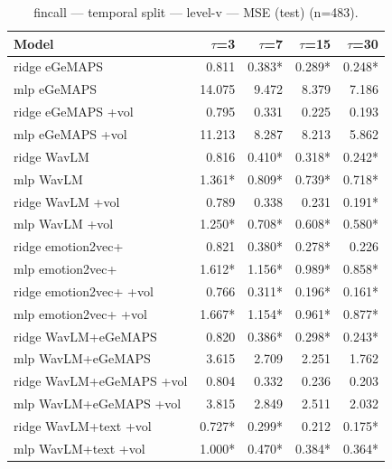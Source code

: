 \begin{table}[t]
\centering
\begin{tabular}{lrrrr}
\toprule
Model & $\tau$=3 & $\tau$=7 & $\tau$=15 & $\tau$=30 \\
\midrule
ridge eGeMAPS & 0.811 & 0.383* & 0.289* & 0.248* \\
mlp eGeMAPS & 14.075 & 9.472 & 8.379 & 7.186 \\
ridge eGeMAPS +vol & 0.795 & 0.331 & 0.225 & 0.193 \\
mlp eGeMAPS +vol & 11.213 & 8.287 & 8.213 & 5.862 \\
ridge WavLM & 0.816 & 0.410* & 0.318* & 0.242* \\
mlp WavLM & 1.361* & 0.809* & 0.739* & 0.718* \\
ridge WavLM +vol & 0.789 & 0.338 & 0.231 & 0.191* \\
mlp WavLM +vol & 1.250* & 0.708* & 0.608* & 0.580* \\
ridge emotion2vec+ & 0.821 & 0.380* & 0.278* & 0.226 \\
mlp emotion2vec+ & 1.612* & 1.156* & 0.989* & 0.858* \\
ridge emotion2vec+ +vol & 0.766 & 0.311* & 0.196* & 0.161* \\
mlp emotion2vec+ +vol & 1.667* & 1.154* & 0.961* & 0.877* \\
ridge WavLM+eGeMAPS & 0.820 & 0.386* & 0.298* & 0.243* \\
mlp WavLM+eGeMAPS & 3.615 & 2.709 & 2.251 & 1.762 \\
ridge WavLM+eGeMAPS +vol & 0.804 & 0.332 & 0.236 & 0.203 \\
mlp WavLM+eGeMAPS +vol & 3.815 & 2.849 & 2.511 & 2.032 \\
ridge WavLM+text +vol & 0.727* & 0.299* & 0.212 & 0.175* \\
mlp WavLM+text +vol & 1.000* & 0.470* & 0.384* & 0.364* \\
\bottomrule
\end{tabular}
\caption{fincall — temporal split — level-v — MSE (test) (n=483).}
\end{table}

